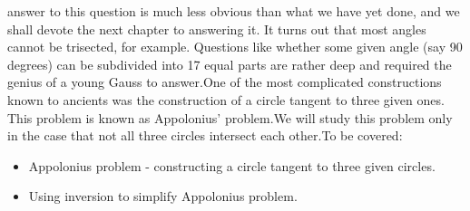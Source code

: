 answer to this question is much less obvious than what we have yet done, and we shall devote the next chapter to answering it. It turns out that most angles cannot be trisected, for example. Questions like whether some given angle (say 90 degrees) can be subdivided into 17 equal parts are rather deep and required the genius of a young Gauss to answer.One of the most complicated constructions known to ancients was the construction of a circle tangent to three given ones. This problem is known as Appolonius' problem.We will study this problem only in the case that not all three circles intersect each other.To be covered:\begin{itemize}\item Appolonius problem - constructing a circle tangent to three given circles.\item Using inversion to simplify Appolonius problem.\end{itemize}